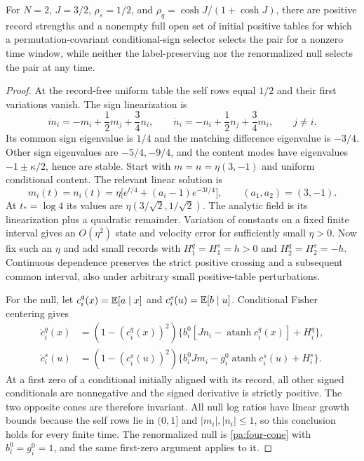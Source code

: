 For $N=2$, $J=3/2$, $\rho_s=1/2$, and $\rho_q=\cosh J/(1+\cosh J)$, there are positive record strengths and a nonempty full open set of initial positive tables for which a permutation-covariant conditional-sign selector selects the pair for a nonzero time window, while neither the label-preserving nor the renormalized null selects the pair at any time.
\begin{proof}
At the record-free uniform table the self rows equal $1/2$ and their first variations vanish. The sign linearization is
\begin{equation}
 \dot m_i=-m_i+\frac12m_j+\frac34n_i,\qquad
 \dot n_i=-n_i+\frac12n_j+\frac34m_i,\qquad j\ne i.
 \label{pa:four-linear}
\end{equation}
Its common sign eigenvalue is $1/4$ and the matching difference eigenvalue is $-3/4$. Other sign eigenvalues are $-5/4,-9/4$, and the content modes have eigenvalues $-1\pm\kappa/2$, hence are stable. Start with $m=n=\eta(3,-1)$ and uniform conditional content. The relevant linear solution is
\begin{equation}
 m_i(t)=n_i(t)=\eta\bigl[e^{t/4}+(a_i-1)e^{-3t/4}\bigr],
 \qquad (a_1,a_2)=(3,-1).
 \label{pa:four-crossing}
\end{equation}
At $t_*=\log4$ its values are $\eta(3/\sqrt2,1/\sqrt2)$. The analytic field is its linearization plus a quadratic remainder. Variation of constants on a fixed finite interval gives an $O(\eta^2)$ state and velocity error for sufficiently small $\eta>0$. Now fix such an $\eta$ and add small records with $H_1^q=H_1^s=h>0$ and $H_2^q=H_2^s=-h$. Continuous dependence preserves the strict positive crossing and a subsequent common interval, also under arbitrary small positive-table perturbations.

For the null, let $c_i^q(x)=\mathbb E[a\mid x]$ and $c_i^s(u)=\mathbb E[b\mid u]$. Conditional Fisher centering gives
\begin{equation}
 \begin{aligned}
 \dot c_i^q(x)&=(1-(c_i^q(x))^2)
 \{b_i^0[Jn_i-\operatorname{atanh}c_i^q(x)]+H_i^q\},\\
 \dot c_i^s(u)&=(1-(c_i^s(u))^2)
 \{b_i^0Jm_i-g_i^0\operatorname{atanh}c_i^s(u)+H_i^s\}.
 \end{aligned}
 \label{pa:four-cone}
\end{equation}
At a first zero of a conditional initially aligned with its record, all other signed conditionals are nonnegative and the signed derivative is strictly positive. The two opposite cones are therefore invariant. All null log ratios have linear growth bounds because the self rows lie in $(0,1]$ and $|m_i|,|n_i|\leq1$, so this conclusion holds for every finite time. The renormalized null is \cref{pa:four-cone} with $b_i^0=g_i^0=1$, and the same first-zero argument applies to it.


\end{proof}
